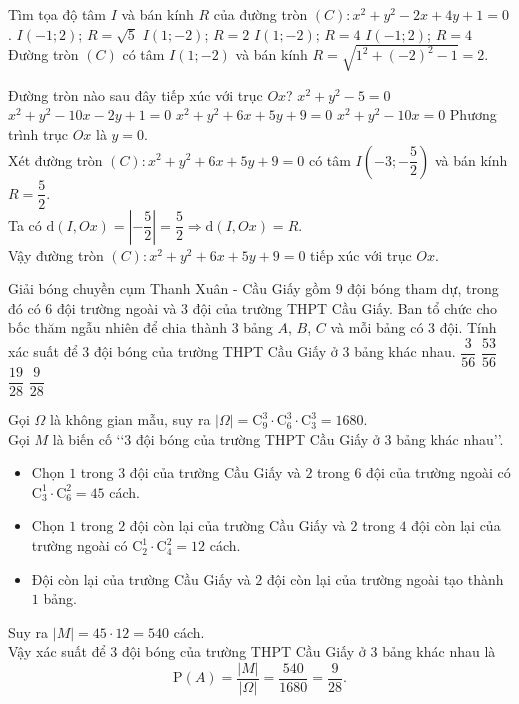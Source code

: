 \begin{ex}%
Tìm tọa độ tâm $I$ và bán kính $R$ của đường tròn $(C)\colon x^2+y^2-2x+4y+1=0$.
\choice
{$I(-1;2)$; $R=\sqrt{5}$}
{\True $I(1;-2)$; $R=2$}
{$I(1;-2)$; $R=4$}
{$I(-1;2)$; $R=4$}
\loigiai
{
Đường tròn $(C)$ có tâm $I(1;-2)$ và bán kính $R=\sqrt{1^2+\left(-2\right)^2-1}=2$.
}
\end{ex}

\begin{ex}%
Đường tròn nào sau đây tiếp xúc với trục $Ox$?
\choice
{$x^2+y^2-5=0$}
{$x^2+y^2-10x-2y+1=0$}
{\True $x^2+y^2+6x+5y+9=0$}
{$x^2+y^2-10x=0$}
\loigiai
{
Phương trình trục $Ox$ là $y=0$. \\
Xét đường tròn $(C)\colon x^2+y^2+6x+5y+9=0$ có tâm $I\left(-3;-\dfrac{5}{2}\right)$ và bán kính $R=\dfrac{5}{2}$. \\
Ta có $\mathrm{d}(I,Ox)=\left|-\dfrac{5}{2}\right|=\dfrac{5}{2} \Rightarrow \mathrm{d}(I,Ox)=R$. \\
Vậy đường tròn $(C)\colon x^2+y^2+6x+5y+9=0$ tiếp xúc với trục $Ox$.
}
\end{ex}

\begin{ex}%
Giải bóng chuyền cụm Thanh Xuân - Cầu Giấy gồm $9$ đội bóng tham dự, trong đó có $6$ đội trường ngoài và $3$ đội của trường THPT Cầu Giấy. Ban tổ chức cho bốc thăm ngẫu nhiên để chia thành $3$ bảng $A$, $B$, $C$ và mỗi bảng có $3$ đội. Tính xác suất để $3$ đội bóng của trường THPT Cầu Giấy ở $3$ bảng khác nhau.
\choice
{$\dfrac{3}{56}$}
{$\dfrac{53}{56}$}
{$\dfrac{19}{28}$}
{\True $\dfrac{9}{28}$}
\loigiai
{
Gọi $\Omega$ là không gian mẫu, suy ra $|\Omega|=\mathrm{C}_{9}^{3}\cdot\mathrm{C}_{6}^{3}\cdot\mathrm{C}_{3}^{3}=1680$. \\
Gọi $M$ là biến cố \lq\lq $3$ đội bóng của trường THPT Cầu Giấy ở $3$ bảng khác nhau\rq\rq.
\begin{itemize}
\item Chọn $1$ trong $3$ đội của trường Cầu Giấy và $2$ trong $6$ đội của trường ngoài có $\mathrm{C}_{3}^{1}\cdot\mathrm{C}_{6}^{2}=45$ cách.
\item Chọn $1$ trong $2$ đội còn lại của trường Cầu Giấy và $2$ trong $4$ đội còn lại của trường ngoài có $\mathrm{C}_{2}^{1}\cdot\mathrm{C}_{4}^{2}=12$ cách.
\item Đội còn lại của trường Cầu Giấy và $2$ đội còn lại của trường ngoài tạo thành $1$ bảng.
\end{itemize}
Suy ra $|M|=45\cdot12=540$ cách. \\
Vậy xác suất để $3$ đội bóng của trường THPT Cầu Giấy ở $3$ bảng khác nhau là
$$\mathrm{P}(A)=\dfrac{|M|}{|\Omega|}=\dfrac{540}{1680}=\dfrac{9}{28}.$$
}
\end{ex}

